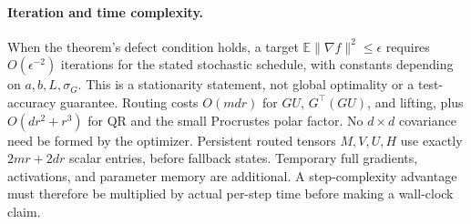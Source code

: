 \paragraph{Iteration and time complexity.}
When the theorem's defect condition holds, a target
$\mathbb E\|\nabla f\|^2\le\epsilon$ requires
$O(\epsilon^{-2})$ iterations for the stated stochastic schedule, with
constants depending on $a,b,L,\sigma_G$. This is a stationarity statement,
not global optimality or a test-accuracy guarantee. Routing costs
$O(mdr)$ for $GU$, $G^\top(GU)$, and lifting, plus $O(dr^2+r^3)$ for QR
and the small Procrustes polar factor. No $d\times d$ covariance need be
formed by the optimizer. Persistent routed tensors $M,V,U,H$ use exactly
$2mr+2dr$ scalar entries, before fallback states. Temporary full gradients,
activations, and parameter memory are additional. A step-complexity
advantage must therefore be multiplied by actual per-step time before
making a wall-clock claim.

